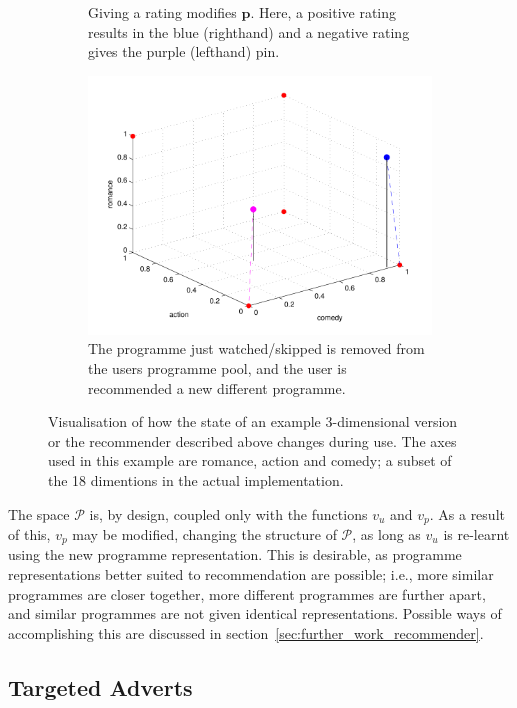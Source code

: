 \begin{figure}[h!]
\begin{center}
\begin{subfigure}[t]{0.32\textwidth}
				\caption{Giving a rating modifies $\mathbf{p}$. Here, a positive rating results in the blue (righthand) and a negative rating gives the purple (lefthand) pin.}
			\end{subfigure}
			\begin{subfigure}[t]{0.32\textwidth}
				\includegraphics[width=\textwidth]{images/recommender_3.pdf}
				\caption{The programme just watched/skipped is removed from the users programme pool, and the user is recommended a new different programme.}
			\end{subfigure}
			\caption{Visualisation of how the state of an example 3-dimensional version or the recommender described above changes during use. The axes used in this example are romance, action and comedy; a subset of the 18 dimentions in the actual implementation.}
			\label{fig:recommender_example}
		\end{center}
	\end{figure}

	The space $\mathcal{P}$ is, by design, coupled only with the functions $v_u$ and $v_p$. As a result of this, $v_p$ may be modified, changing the structure of $\mathcal{P}$, as long as $v_u$ is re-learnt using the new programme representation. This is desirable, as programme representations better suited to recommendation are possible; i.e., more similar programmes are closer together, more different programmes are further apart, and similar programmes are not given identical representations. Possible ways of accomplishing this are discussed in section~\ref{sec:further_work_recommender}.


\subsection{Targeted Adverts}
\label{sec:design_adverts}

